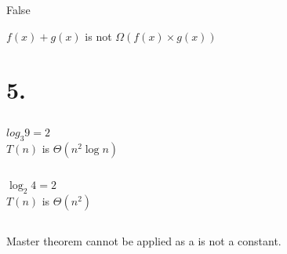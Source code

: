 \documentclass{article}
\begin{document}
False

\(f(x)+g(x)\) is not \(\Omega(f(x)\times g(x))\)

\section{5.}

    \subsection{}

\(log_3{9} = 2\)\\
\(T(n) \) is \( \Theta(n^2\log{n})\)

    \subsection{}

\(\log_2{4} = 2\)\\
\(T(n)\) is \(\Theta (n^2)\)

    \subsection{}

Master theorem cannot be applied as a is not a constant.

    \subsection{}
\end{document}
